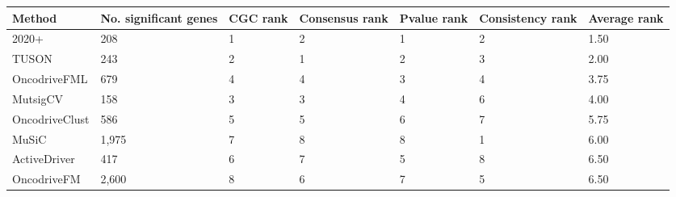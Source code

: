\begin{landscape}
\begin{tabular}{p{3cm} p{3cm} p{2cm} p{2cm} p{2cm} p{2cm} p{2cm}}
\toprule
  Method & No. significant genes &  CGC rank &  Consensus rank &  Pvalue rank &  Consistency rank &  Average rank \\
\midrule
  2020+ &  208 &  1 &  2 &  1 &  2 &  1.50 \\
  TUSON &  243 &  2 &  1 &  2 &  3 &  2.00 \\
  OncodriveFML &  679 &  4 &  4 &  3 &  4 &  3.75 \\
  MutsigCV &  158 &  3 &  3 &  4 &  6 &  4.00 \\
  OncodriveClust &  586 &  5 &  5 &  6 &  7 &  5.75 \\
  MuSiC &  1,975 &  7 &  8 &  8 &  1 &  6.00 \\
  ActiveDriver &  417 &  6 &  7 &  5 &  8 &  6.50 \\
  OncodriveFM &  2,600 &  8 &  6 &  7 &  5 &  6.50 \\ 
\bottomrule
\end{tabular}
\end{landscape}

